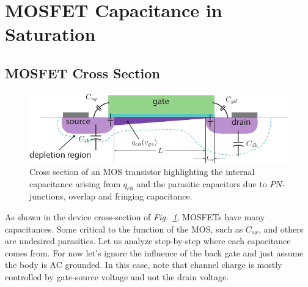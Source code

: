\section{MOSFET Capacitance in Saturation}
\subsection{MOSFET Cross Section}
\begin{figure}[tb]
\centering
\includegraphics[width=.75\columnwidth]{mos_caps_xsect}
\caption{Cross section of an MOS transistor highlighting the internal capacitance arising from $q_{ch}$ and the parasitic capacitors due to $PN$-junctions, overlap and fringing capacitance.}
\label{fig:moscapsxsect}
\end{figure}
As shown in the device cross-section of \emph{Fig.~\ref{fig:moscapsxsect}}, MOSFETs have many capacitances. Some critical to the function of the MOS, such as $C_{ox}$, and others are undesired parasitics.  Let us analyze step-by-step where each capacitance comes from.  For now let's ignore the influence of the back gate and just assume the body is AC grounded. In this case, note that channel charge is mostly controlled by gate-source voltage and not the drain voltage.  

